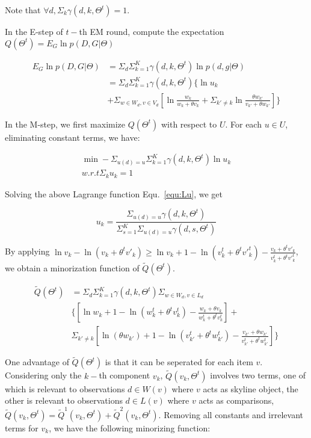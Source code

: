 \documentclass[sigconf]{acmart}
\begin{document}
Note that $\forall d, \Sigma_k \gamma(d,k,\Theta^t)=1$.

In the E-step of $t-$th  EM round, compute the expectation $Q(\Theta^t)=E_{G} \ln p(D,G|\Theta) $

\begin{align}\label{equ:estep}
E_{G} \ln p(D,G|\Theta) & = \Sigma_d \Sigma_{k=1}^K \gamma(d,k,\Theta^t) \ln p(d,g|\Theta)\\\nonumber
& = \Sigma_d \Sigma_{k=1}^K \gamma(d,k,\Theta^t) \{ \ln u_k \\ \nonumber
&+ \Sigma_{w\in W_d, v\in V_d} [\ln \frac{w_k}{w_k +\theta v_k} +\Sigma_{k'\neq k} \ln \frac{\theta w_{k'}}{v_{k'}+\theta w_{k'}}]\}
\end{align}

In the M-step, we first maximize $Q(\Theta^t)$ with respect to $U$. For each $u \in U$, eliminating constant terms, we have:

\begin{align}\label{equ:Lu}
\min -\Sigma_{u(d)=u} \Sigma_{k=1}^K \gamma(d,k,\Theta^t) \ln u_k\\ \nonumber
w.r.t \Sigma_k u_k =1
\end{align}
 
Solving the above Lagrange function Equ.~\ref{equ:Lu}, we get 

\begin{equation}\label{equ:u}
u_k =\frac{\Sigma_{u(d)=u}\gamma(d,k,\Theta^t)}{\Sigma_{s=1}^K \Sigma_{u(d)=u}\gamma(d,s,\Theta^t)}
\end{equation}

By applying $\ln v_k - \ln (v_k + \theta^t v'_k) \geq \ln v_k + 1 - \ln (v_k^t + \theta^t {v'}_k^t) - \frac{v_k + \theta^t v'_k}{v_k^t + \theta^t {v'}_k^t}$, we obtain a minorization function of $\tilde{Q}(\Theta^t)$.

\begin{align}\label{equ:minorization}
\tilde{Q}(\Theta^t) &= \Sigma_d \Sigma_{k=1}^K \gamma(d,k,\Theta^t)  \Sigma_{w\in W_d, v\in L_d} \\\nonumber
& \{ [\ln w_k + 1 - \ln (w_k^t + \theta^t v_k^t) - \frac{w_k+\theta v_k}{w_k^t + \theta^tv_k^t}]+\\\nonumber
&\Sigma_{k'\neq k} [\ln (\theta w_{k'}) + 1 - \ln (v_{k'}^t + \theta^t w_{k'}^t) -  \frac{v_{k'}+\theta w_{k'}}{v_{k'}^t + \theta^tw_{k'}^t}]
\}
\end{align}

One advantage of $\tilde{Q}(\Theta^t)$ is that it can be seperated for each item $v$. Considering only the $k-$th component $v_k$, $\tilde{Q}(v_k,\Theta^t)$ involves two terms, one of which is relevant to observations $d\in W(v)$ where $v$ acts as skyline object, the other is relevant to observations $d \in L(v)$ where $v$ acts as comparisons, $\tilde{Q}(v_k,\Theta^t)=\tilde{Q}^1(v_k,\Theta^t)+\tilde{Q}^2(v_k,\Theta^t)$. Removing all constants and irrelevant terms for $v_k$, we have the following minorizing function:
\end{document}
